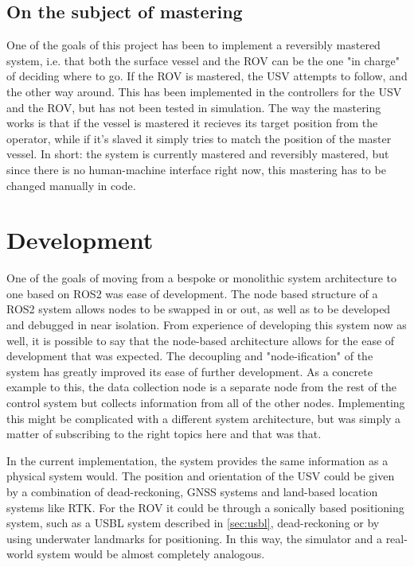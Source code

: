 \documentclass[class=article, crop=false]{standalone}
\begin{document}
\subsection{On the subject of mastering}
One of the goals of this project has been to implement a reversibly mastered system, i.e. that both the surface vessel and the ROV can be the one "in charge" of deciding where to go. If the ROV is mastered, the USV attempts to follow, and the other way around. This has been implemented in the controllers for the USV and the ROV, but has not been tested in simulation. The way the mastering works is that if the vessel is mastered it recieves its target position from the operator, while if it's slaved it simply tries to match the position of the master vessel. In short: the system is currently mastered and reversibly mastered, but since there is no human-machine interface right now, this mastering has to be changed manually in code.

\section{Development}
One of the goals of moving from a bespoke or monolithic system architecture to one based on ROS2 was ease of development. The node based structure of a ROS2 system allows nodes to be swapped in or out, as well as to be developed and debugged in near isolation. From experience of developing this system now as well, it is possible to say that the node-based architecture allows for the ease of development that was expected. The decoupling and "node-ification" of the system has greatly improved its ease of further development. As a concrete example to this, the data collection node is a separate node from the rest of the control system but collects information from all of the other nodes. Implementing this might be complicated with a different system architecture, but was simply a matter of subscribing to the right topics here and that was that.

In the current implementation, the system provides the same information as a physical system  would. The position and orientation of the USV could be given by a combination of dead-reckoning, GNSS systems and land-based location systems like RTK. For the ROV it could be through a sonically based positioning system, such as a USBL system described in \cref{sec:usbl}, dead-reckoning or by using underwater landmarks for positioning. In this way, the simulator and a real-world system would be almost completely analogous.
\end{document}
